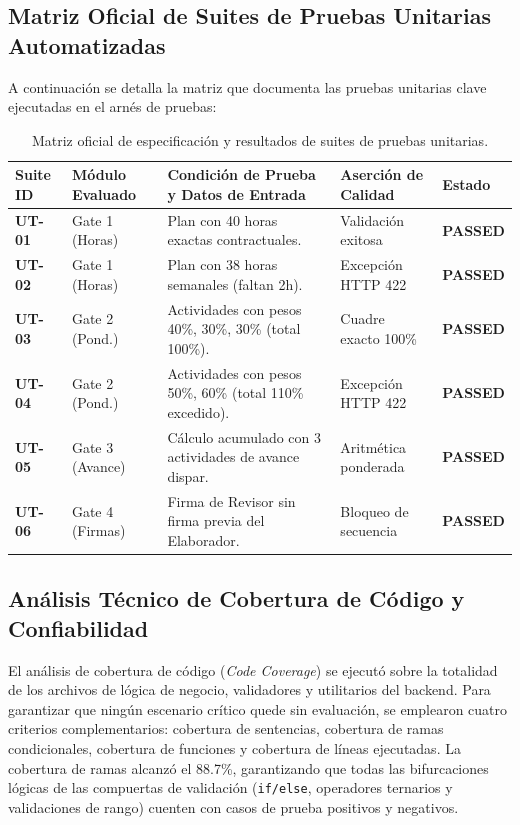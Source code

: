 \documentclass[12pt,a4paper]{article}
\begin{document}
\subsection{Matriz Oficial de Suites de Pruebas Unitarias Automatizadas}
A continuación se detalla la matriz que documenta las pruebas unitarias clave ejecutadas en el arnés de pruebas:

\begin{table}[H]
\centering
\small
\renewcommand{\arraystretch}{1.2}
\begin{tabularx}{\textwidth}{|>{\hsize=0.45\hsize\centering\arraybackslash\bfseries\footnotesize}X|>{\hsize=0.85\hsize\raggedright\arraybackslash\footnotesize}X|>{\hsize=1.5\hsize\raggedright\arraybackslash\footnotesize}X|>{\hsize=0.7\hsize\centering\arraybackslash\footnotesize}X|>{\hsize=0.5\hsize\centering\arraybackslash\footnotesize}X|}
\hline
\rowcolor{tableheader}
\textbf{Suite ID} & \textbf{Módulo Evaluado} & \textbf{Condición de Prueba y Datos de Entrada} & \textbf{Aserción de Calidad} & \textbf{Estado} \\
\hline
UT-01 & Gate 1 (Horas) & Plan con 40 horas exactas contractuales. & Validación exitosa & \textbf{PASSED} \\
\hline
UT-02 & Gate 1 (Horas) & Plan con 38 horas semanales (faltan 2h). & Excepción HTTP 422 & \textbf{PASSED} \\
\hline
UT-03 & Gate 2 (Pond.) & Actividades con pesos 40\%, 30\%, 30\% (total 100\%). & Cuadre exacto 100\% & \textbf{PASSED} \\
\hline
UT-04 & Gate 2 (Pond.) & Actividades con pesos 50\%, 60\% (total 110\% excedido). & Excepción HTTP 422 & \textbf{PASSED} \\
\hline
UT-05 & Gate 3 (Avance) & Cálculo acumulado con 3 actividades de avance dispar. & Aritmética ponderada & \textbf{PASSED} \\
\hline
UT-06 & Gate 4 (Firmas) & Firma de Revisor sin firma previa del Elaborador. & Bloqueo de secuencia & \textbf{PASSED} \\
\hline
\end{tabularx}
\caption{Matriz oficial de especificación y resultados de suites de pruebas unitarias.}
\label{tab:suites_unitarias}
\end{table}

\subsection{Análisis Técnico de Cobertura de Código y Confiabilidad}
El análisis de cobertura de código (\textit{Code Coverage}) se ejecutó sobre la totalidad de los archivos de lógica de negocio, validadores y utilitarios del backend. Para garantizar que ningún escenario crítico quede sin evaluación, se emplearon cuatro criterios complementarios: cobertura de sentencias, cobertura de ramas condicionales, cobertura de funciones y cobertura de líneas ejecutadas. La cobertura de ramas alcanzó el 88.7\%, garantizando que todas las bifurcaciones lógicas de las compuertas de validación (\texttt{if/\allowbreak  else}, operadores ternarios y validaciones de rango) cuenten con casos de prueba positivos y negativos.
\end{document}
